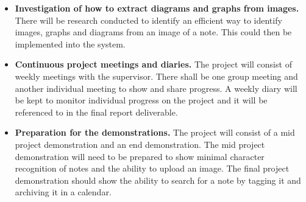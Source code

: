 \documentclass[11pt,fleqn,twoside]{article}
\begin{document}
\begin{itemize}
\item \textbf{Investigation of how to extract diagrams and graphs from images.} There will be research conducted to identify an efficient way to identify images, graphs and diagrams from an image of a note. This could then be implemented into the system.

\item \textbf{Continuous project meetings and diaries.} The project will consist of weekly meetings with the supervisor. There shall be one group meeting and another individual meeting to show and share progress. A weekly diary will be kept to monitor individual progress on the project and it will be referenced to in the final report deliverable.

\item \textbf{Preparation for the demonstrations.} The project will consist of a mid project demonstration and an end demonstration. The mid project demonstration will need to be prepared to show minimal character recognition of notes and the ability to upload an image. The final project demonstration should show the ability to search for a note by tagging it and archiving it in a calendar.

\end{itemize}

\end{document}
